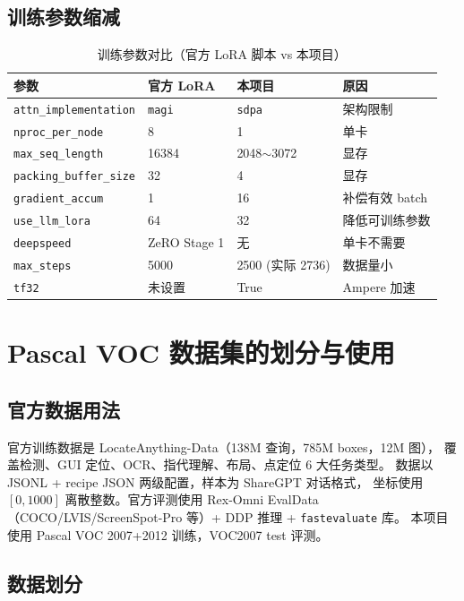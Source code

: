 \documentclass[11pt,a4paper]{article}
\begin{document}
\subsection{训练参数缩减}

\begin{table}[H]
\centering\small
\caption{训练参数对比（官方 LoRA 脚本 vs 本项目）}\label{tab:param}
\begin{tabularx}{\textwidth}{lXXl}
\toprule
\textbf{参数} & \textbf{官方 LoRA} & \textbf{本项目} & \textbf{原因} \\
\midrule
\texttt{attn\_implementation} & \texttt{magi} & \texttt{sdpa} & 架构限制 \\
\texttt{nproc\_per\_node}     & 8 & 1 & 单卡 \\
\texttt{max\_seq\_length}     & 16384 & 2048$\sim$3072 & 显存 \\
\texttt{packing\_buffer\_size}& 32 & 4 & 显存 \\
\texttt{gradient\_accum}      & 1 & 16 & 补偿有效 batch \\
\texttt{use\_llm\_lora}       & 64 & 32 & 降低可训练参数 \\
\texttt{deepspeed}            & ZeRO Stage 1 & 无 & 单卡不需要 \\
\texttt{max\_steps}           & 5000 & 2500 (实际 2736) & 数据量小 \\
\texttt{tf32}                 & 未设置 & True & Ampere 加速 \\
\bottomrule
\end{tabularx}
\end{table}


\section{Pascal VOC 数据集的划分与使用}

\subsection{官方数据用法}

官方训练数据是 LocateAnything-Data（138M 查询，785M boxes，12M 图），
覆盖检测、GUI 定位、OCR、指代理解、布局、点定位 6 大任务类型。
数据以 JSONL + recipe JSON 两级配置，样本为 ShareGPT 对话格式，
坐标使用 $[0, 1000]$ 离散整数。官方评测使用 Rex-Omni EvalData
（COCO/LVIS/ScreenSpot-Pro 等）+ DDP 推理 + \texttt{fastevaluate} 库。
本项目使用 Pascal VOC 2007+2012 训练，VOC2007 test 评测。

\subsection{数据划分}
\end{document}
